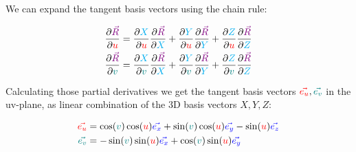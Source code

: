 We can expand the tangent basis vectors using the chain rule:

\begin{align*}
    \frac{\partial \begingroup\color{violet}\vec{R}\endgroup}{\partial \begingroup\color{red}u\endgroup} &=
    \frac{\partial \begingroup\color{cyan}X\endgroup}{\partial \begingroup\color{red}u\endgroup} \frac{\partial \begingroup\color{violet}\vec{R}\endgroup}{\partial \begingroup\color{cyan}X\endgroup}
    + \frac{\partial \begingroup\color{cyan}Y\endgroup}{\partial \begingroup\color{red}u\endgroup} \frac{\partial \begingroup\color{violet}\vec{R}\endgroup}{\partial \begingroup\color{cyan}Y\endgroup}
    + \frac{\partial \begingroup\color{cyan}Z\endgroup}{\partial \begingroup\color{red}u\endgroup} \frac{\partial \begingroup\color{violet}\vec{R}\endgroup}{\partial \begingroup\color{cyan}Z\endgroup}\\
    \frac{\partial \begingroup\color{violet}\vec{R}\endgroup}{\partial \begingroup\color{teal}v\endgroup} &=
    \frac{\partial \begingroup\color{cyan}X\endgroup}{\partial \begingroup\color{teal}v\endgroup} \frac{\partial \begingroup\color{violet}\vec{R}\endgroup}{\partial \begingroup\color{cyan}X\endgroup}
    + \frac{\partial \begingroup\color{cyan}Y\endgroup}{\partial \begingroup\color{teal}v\endgroup} \frac{\partial \begingroup\color{violet}\vec{R}\endgroup}{\partial \begingroup\color{cyan}Y\endgroup}
    + \frac{\partial \begingroup\color{cyan}Z\endgroup}{\partial \begingroup\color{teal}v\endgroup} \frac{\partial \begingroup\color{violet}\vec{R}\endgroup}{\partial \begingroup\color{cyan}Z\endgroup}
\end{align*}

Calculating those partial derivatives we get the tangent basis vectors $\begingroup\color{red}\vec{e_u}\endgroup, \begingroup\color{teal}\vec{e_v}\endgroup$ in the uv-plane, as linear combination of the 3D basis vectors $X, Y ,Z$:

\begin{align*}
    \begingroup\color{red}\vec{e_u}\endgroup &= \cos(\begingroup\color{teal}v\endgroup) \cos(\begingroup\color{red}u\endgroup)\begingroup\color{blue}\vec{e_x}\endgroup 
    + \sin(\begingroup\color{teal}v\endgroup) \cos(\begingroup\color{red}u\endgroup)\begingroup\color{blue}\vec{e_y}\endgroup
    - \sin(\begingroup\color{red}u\endgroup)\begingroup\color{blue}\vec{e_z}\endgroup\\
    \begingroup\color{teal}\vec{e_v}\endgroup &= -\sin(\begingroup\color{teal}v\endgroup) \sin(\begingroup\color{red}u\endgroup)\begingroup\color{blue}\vec{e_x}\endgroup 
    + \cos(\begingroup\color{teal}v\endgroup) \sin(\begingroup\color{red}u\endgroup)\begingroup\color{blue}\vec{e_y}\endgroup
\end{align*}

